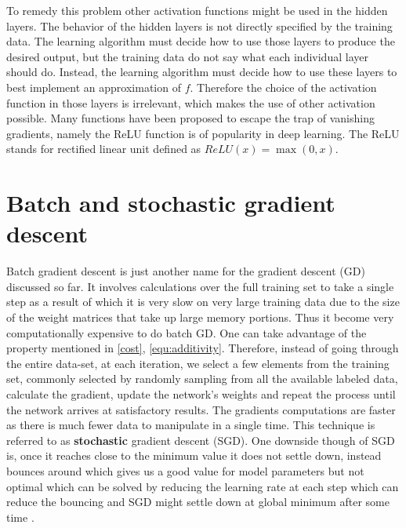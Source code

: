 To remedy this problem other activation functions might be used in the hidden layers. The behavior of the hidden layers is not directly
specified by the training data. The learning algorithm must decide how to use those layers to produce the desired output, but the training data do not say what each individual layer should do. Instead, the learning algorithm must decide how to use these layers to best implement an approximation of $f$. Therefore the choice of the activation function in those layers is irrelevant, which makes the use of other activation possible. Many functions have been proposed to escape the trap of vanishing gradients, namely the ReLU function is of popularity in deep learning. The ReLU stands for rectified linear unit defined as $ReLU(x) = \max (0, x)$.

\section{Batch and stochastic gradient descent}

Batch gradient descent is just another name for the gradient descent (GD) discussed so far. It involves calculations over the full training set to take a single step as a result of which it is very slow on very large training data due to the size of the weight matrices that take up large memory portions. Thus it become very computationally expensive to do batch GD. One can take advantage of the property mentioned in \cref{cost}, \cref{equ:additivity}. Therefore, instead of going through the entire data-set, at each iteration, we select a few elements from the
training set, commonly selected by randomly sampling from all the available labeled data, calculate the gradient, update the network's weights and repeat the process until the network arrives at satisfactory results. The gradients computations are faster as there is much fewer data to manipulate in a single time. This technique is referred to as \textbf{stochastic} gradient descent (SGD). One downside though of SGD is, once it reaches close to the minimum value it does not settle down, instead bounces around which gives us a good value for model parameters but not optimal which can be solved by reducing the learning rate at each step which can reduce the bouncing and SGD might settle down at global minimum after some time \cite{atnn}.
